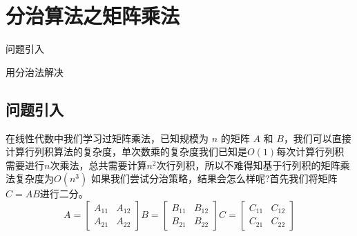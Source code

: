 \chapter{分治算法之矩阵乘法}
\begin{introduction}
	\item 问题引入
	\item 用分治法解决
\end{introduction}

\section{问题引入}
在线性代数中我们学习过矩阵乘法，已知规模为 $n$ 的矩阵 $A$ 和 $B$，我们可以直接计算行列积算法的复杂度，单次数乘的复杂度我们已知是$ O(1)$每次计算行列积需要进行$n$次乘法，总共需要计算$n^2$次行列积，所以不难得知基于行列积的矩阵乘法复杂度为$O(n^3)$
如果我们尝试分治策略，结果会怎么样呢?首先我们将矩阵$C = AB$进行二分。
$$
A=\left[\begin{array}{ll}
A_{11} & A_{12} \\
A_{21} & A_{22}
\end{array}\right] B=\left[\begin{array}{ll}
B_{11} & B_{12} \\
B_{21} & B_{22}
\end{array}\right] C=\left[\begin{array}{ll}
C_{11} & C_{12} \\
C_{21} & C_{22}
\end{array}\right]
$$

